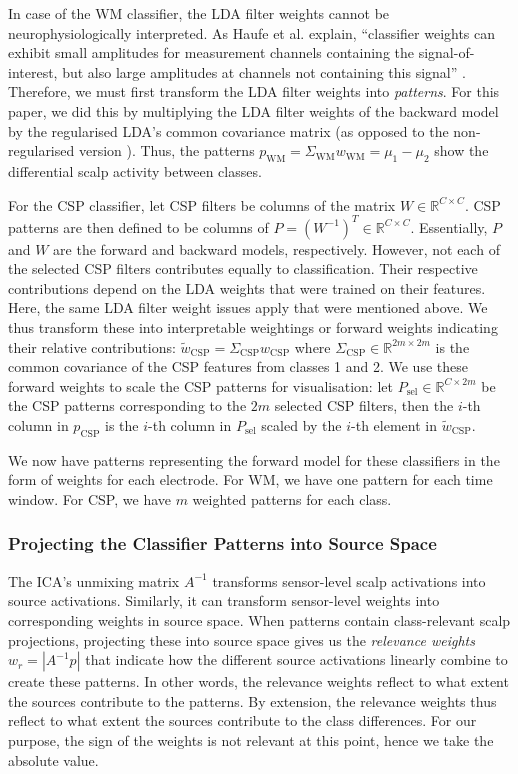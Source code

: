 In case of the WM classifier, the LDA filter weights cannot be neurophysiologically interpreted. As Haufe et al. explain, ``classifier weights can exhibit small amplitudes for measurement channels containing the signal-of-interest, but also large amplitudes at channels not containing this signal'' \cite{haufe2014}. Therefore, we must first transform the LDA filter weights into \emph{patterns}. For this paper, we did this by multiplying the LDA filter weights of the backward model by the regularised LDA's common covariance matrix (as opposed to the non-regularised version \cite{haufe2014}). Thus, the patterns $p_\textrm{WM}=\Sigma_\textrm{WM} w_\textrm{WM}=\mu_{1}-\mu_{2}$ show the differential scalp activity between classes.

For the CSP classifier, let CSP filters be columns of the matrix $W \in \mathbb{R}^{C\times C}$. CSP patterns are then defined to be columns of $P = (W^{-1})^T \in \mathbb{R}^{C\times C}$. Essentially, $P$ and $W$ are the forward and backward models, respectively. However, not each of the selected CSP filters contributes equally to classification. Their respective contributions depend on the LDA weights that were trained on their features. Here, the same LDA filter weight issues apply that were mentioned above. We thus transform these into interpretable weightings or forward weights indicating their relative contributions: $\tilde{w}_\textrm{CSP}=\Sigma_\textrm{CSP} w_\textrm{CSP}$ where $\Sigma_\textrm{CSP} \in \mathbb{R}^{2m \times 2m}$ is the common covariance of the CSP features from classes 1 and 2. We use these forward weights to scale the CSP patterns for visualisation: let $P_\textrm{sel} \in \mathbb{R}^{C\times 2m}$ be the CSP patterns corresponding to the $2m$ selected CSP filters, then the $i$-th column in $p_\textrm{CSP}$ is the $i$-th column in $P_\textrm{sel}$ scaled by the $i$-th element in $\tilde{w}_\textrm{CSP}$.  

We now have patterns representing the forward model for these classifiers in the form of weights for each electrode. For WM, we have one pattern for each time window. For CSP, we have $m$ weighted patterns for each class.


\subsubsection{Projecting the Classifier Patterns into Source Space}

The ICA's unmixing matrix $A^{-1}$ transforms sensor-level scalp activations into source activations. Similarly, it can transform sensor-level weights into corresponding weights in source space. When patterns contain class-relevant scalp projections, projecting these into source space gives us the \emph{relevance weights} $w_r=|A^{-1} p|$ that indicate how the different source activations linearly combine to create these patterns. In other words, the relevance weights reflect to what extent the sources contribute to the patterns. By extension, the relevance weights thus reflect to what extent the sources contribute to the class differences. For our purpose, the sign of the weights is not relevant at this point, hence we take the absolute value.

